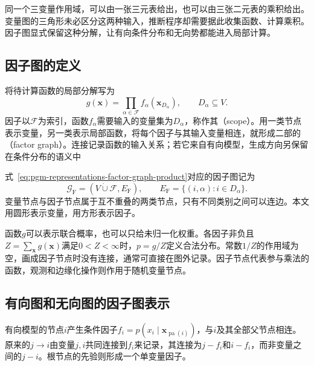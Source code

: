 同一个三变量作用域，可以由一张三元表给出，也可以由三张二元表的乘积给出。变量图的三角形未必区分这两种输入，推断程序却需要据此收集函数、计算乘积。因子图显式保留这种分解，让有向条件分布和无向势都能进入局部计算。

\subsection{因子图的定义}
\label{sec:pgm-representations-factor-graph-definition}

将待计算函数的局部分解写为
\begin{equation}
  g(\bm{x})=\prod_{\alpha\in\mathcal{F}}
  f_\alpha(\bm{x}_{D_\alpha}),
  \qquad D_\alpha\subseteq V.
  \label{eq:pgm-representations-factor-graph-product}
\end{equation}
因子以$\mathcal{F}$为索引，函数$f_\alpha$需要输入的变量集为$D_\alpha$，称作其（scope）。用一类节点表示变量，另一类表示局部函数，将每个因子与其输入变量相连，就形成二部的（factor graph）。连接记录函数的输入关系；若它来自有向模型，生成方向另保留在条件分布的语义中

\begin{definition}[因子图]
  \label{def:pgm-representations-factor-graph}
  式~\eqref{eq:pgm-representations-factor-graph-product}对应的因子图记为
  \[
    \mathcal{G}_{\mathrm F}
    =(V\mathbin{\dot\cup}\mathcal{F},E_{\mathrm F}),
    \qquad
    E_{\mathrm F}=\{(i,\alpha):i\in D_\alpha\}.
  \]
  变量节点与因子节点属于互不重叠的两类节点，只有不同类别之间可以连边。本文用圆形表示变量，用方形表示因子。
\end{definition}

函数$g$可以表示联合概率，也可以只给未归一化权重。各因子非负且$Z=\sum_{\bm{x}}g(\bm{x})$满足$0<Z<\infty$时，$p=g/Z$定义合法分布。常数$1/Z$的作用域为空，画成因子节点时没有连接，通常可直接在图外记录。因子节点代表参与乘法的函数，观测和边缘化操作则作用于随机变量节点。

\subsection{有向图和无向图的因子图表示}
\label{sec:pgm-representations-two-factor-graphs}

有向模型的节点$i$产生条件因子$f_i=p(x_i\mid\bm{x}_{\operatorname{pa}(i)})$，与$i$及其全部父节点相连。原来的$j\to i$由变量$j,i$共同连接到$f_i$来记录，其连接为$j-f_i$和$i-f_i$，而非变量之间的$j-i$。根节点的先验则形成一个单变量因子。

